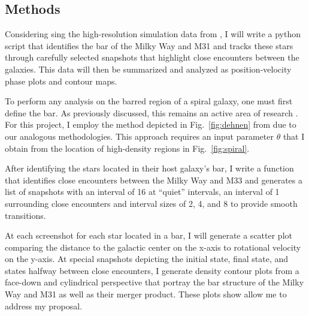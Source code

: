 \documentclass[twocolumn]{aastex631}
\DeclareRobustCommand{\Figref}[1]{Fig.~\ref{#1}}
\begin{document}
\subsection{Methods}
Considering sing the high-resolution simulation data from \citet{vandermarel:12},
I will write a python script that identifies the bar of the Milky Way
and M31 and tracks these stars through carefully selected snapshots
that highlight close encounters between the galaxies. This data will
then be summarized and analyzed as position-velocity phase plots and
contour maps.

To perform any analysis on the barred region of a spiral galaxy, one
must first define the bar. As previously discussed, this remains an
active area of research \citep{berentzen:03}. For this project, I
employ the method depicted in \Figref{fig:dehnen} from
\citet{dehnen:23} due to our analogous methodologies. This approach
requires an input parameter $\theta$ that I obtain from the location
of high-density regions in \Figref{fig:spiral}.

After identifying the stars located in their host galaxy's bar, I
write a function that identifies close encounters between the Milky
Way and M33 and generates a list of snapshots with an interval of 16
at ``quiet'' intervals, an interval of 1 surrounding close encounters
and interval sizes of 2, 4, and 8 to provide smooth transitions.

At each screenshot for each star located in a bar, I will generate a
scatter plot comparing the distance to the galactic center on the
x-axis to rotational velocity on the y-axis. At special snapshots
depicting the initial state, final state, and states halfway between
close encounters, I generate density contour plots from a face-down
and cylindrical perspective that portray the bar structure of the
Milky Way and M31 as well as their merger product. These plots show
allow me to address my proposal.
\end{document}
